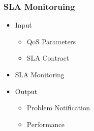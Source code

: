 \subsubsection{SLA Monitoruing}
\begin{itemize}
	\item Input
	\begin{itemize}
		\item QoS Parameters
		\item SLA Contract
	\end{itemize}
	\item SLA Monitoring
	\item Output
	\begin{itemize}
		\item Problem Notification
		\item Performance
	\end{itemize}
\end{itemize}
